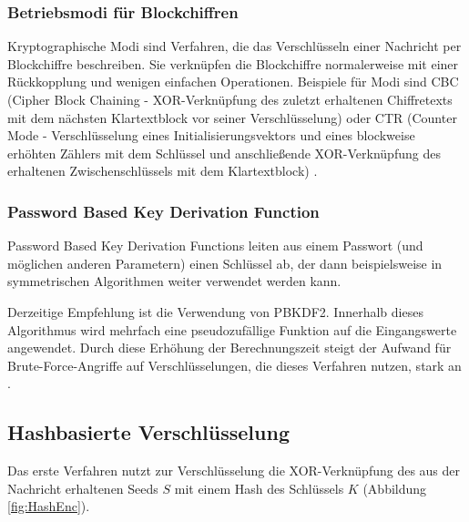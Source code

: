 \subsubsection*{Betriebsmodi für Blockchiffren}
Kryptographische Modi sind Verfahren, die das Verschlüsseln einer Nachricht per Blockchiffre beschreiben. Sie verknüpfen die Blockchiffre normalerweise mit einer Rückkopplung und wenigen einfachen Operationen. Beispiele für Modi sind CBC (Cipher Block Chaining - XOR-Verknüpfung des zuletzt erhaltenen Chiffretexts mit dem nächsten Klartextblock vor seiner Verschlüsselung) oder CTR (Counter Mode - Verschlüsselung eines Initialisierungsvektors und eines blockweise erhöhten Zählers mit dem Schlüssel und anschließende XOR-Verknüpfung des erhaltenen Zwischenschlüssels mit dem Klartextblock) \cite{Schneier2006}.

\subsubsection*{Password Based Key Derivation Function}
Password Based Key Derivation Functions leiten aus einem Passwort (und möglichen anderen Parametern) einen Schlüssel ab, der dann beispielsweise in symmetrischen Algorithmen weiter verwendet werden kann.

Derzeitige Empfehlung ist die Verwendung von PBKDF2. Innerhalb dieses Algorithmus wird mehrfach eine pseudozufällige Funktion auf die Eingangswerte angewendet. Durch diese Erhöhung der Berechnungszeit steigt der Aufwand für Brute-Force-Angriffe auf Verschlüsselungen, die dieses Verfahren nutzen, stark an  \cite{pbkdf2000}.

\subsection{Hashbasierte Verschlüsselung}

Das erste Verfahren nutzt zur Verschlüsselung die XOR-Verknüpfung des aus der Nachricht erhaltenen Seeds \(S\) mit einem Hash des Schlüssels \(K\) (Abbildung \ref{fig:HashEnc}).  

